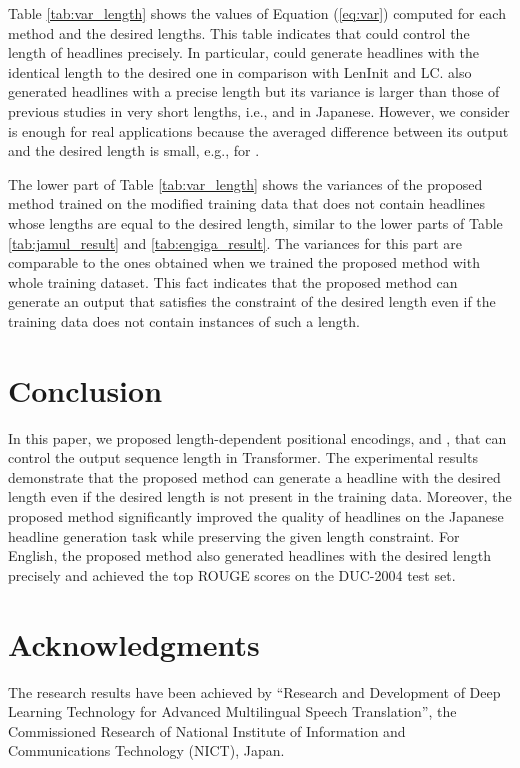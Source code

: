 \documentclass[11pt,a4paper]{article}
\begin{document}
Table \ref{tab:var_length} shows the values of Equation (\ref{eq:var}) computed for each method and the desired lengths.
This table indicates that  could control the length of headlines precisely.
In particular,  could generate headlines with the identical length to the desired one in comparison with LenInit and LC.
 also generated headlines with a precise length but its variance is larger than those of previous studies in very short lengths, i.e.,  and  in Japanese.
However, we consider  is enough for real applications because the averaged difference between its output and the desired length is small, e.g.,  for .


The lower part of Table \ref{tab:var_length} shows the variances of the proposed method trained on the modified training data that does not contain headlines whose lengths are equal to the desired length, similar to the lower parts of Table \ref{tab:jamul_result} and \ref{tab:engiga_result}.
The variances for this part are comparable to the ones obtained when we trained the proposed method with whole training dataset.
This fact indicates that the proposed method can generate an output that satisfies the constraint of the desired length even if the training data does not contain instances of such a length.


\section{Conclusion}
In this paper, we proposed length-dependent positional encodings,  and , that can control the output sequence length in Transformer.
The experimental results demonstrate that the proposed method can generate a headline with the desired length even if the desired length is not present in the training data.
Moreover, the proposed method significantly improved the quality of headlines on the Japanese headline generation task while preserving the given length constraint.
For English, the proposed method also generated headlines with the desired length precisely and achieved the top ROUGE scores on the DUC-2004 test set.


\section*{Acknowledgments}
The research results have been achieved by ``Research and Development of Deep Learning Technology for Advanced Multilingual Speech Translation'', the Commissioned Research of National Institute of Information and Communications Technology (NICT), Japan.



\end{document}
